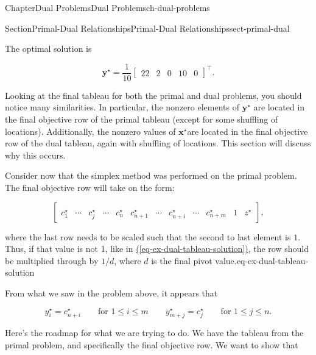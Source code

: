 \documentclass[oneside,10pt,]{book}
\newcommand{\xreffont}{\relax}
\numberwithin{equation}{section}
\newcommand{\amp}{&}
\begin{document}
\begin{chapterptx}{Chapter}{Dual Problems}{}{Dual Problems}{}{}{ch-dual-problems}
\begin{sectionptx}{Section}{Primal-Dual Relationships}{}{Primal-Dual Relationships}{}{}{sect-primal-dual}
\begin{equation}
\end{equation}
%
\par
The optimal solution is%
\par
%
\begin{equation*}
\boldsymbol{y}^{\star} = \frac{1}{10} \left[\begin{array}{rr|rrr} 22 \amp 2 \amp 0 \amp 10 \amp 0 \end{array} \right]^{\intercal}.
\end{equation*}
%
\par
Looking at the final tableau for both the primal and dual problems, you should notice many similarities. In particular, the nonzero elements of \(\boldsymbol{y}^{\star}\) are located in the final objective row of the primal tableau (except for some shuffling of locations). Additionally, the nonzero values of \(\boldsymbol{x}^{\star}\)are located in the final objective row of the dual tableau, again with shuffling of locations. This section will discuss why this occurs.%
\par
Consider now that the simplex method was performed on the primal problem. The final objective row will take on the form:%
\par
%
\begin{equation*}
\left[ \begin{array}{ccccc|cccccc|c} \amp\amp\amp\amp\amp\amp\amp\amp\amp\amp \\ \hline c_1^{\star} \amp \cdots \amp c_j^{\star} \amp \cdots \amp c_n^{\star} \amp c_{n+1}^{\star} \amp \cdots \amp c_{n+i}^{\star} \amp \cdots \amp c_{n+m}^{\star} \amp 1 \amp z^{\star} \end{array}  \right],
\end{equation*}
%
\par
where the last row needs to be scaled such that the second to last element is \(1\). Thus, if that value is not 1, like in \hyperref[eq-ex-dual-tableau-solution]{({\xreffont\ref{eq-ex-dual-tableau-solution}})}, the row should be multiplied through by \(1/d\), where \(d\) is the final pivot value.eq-ex-dual-tableau-solution%
\par
From what we saw in the problem above, it appears that%
\par
%
\begin{equation}
y_i^{\star}  = c_{n+i}^{\star} \qquad \text{for $1 \leq i \leq m$} \qquad y_{m+j}^{\star} = c_j^{\star} \qquad \text{for $1 \leq j \leq n$}.\label{eq-y-obj}
\end{equation}
%
\par
Here's the roadmap for what we are trying to do. We have the tableau from the primal problem, and specifically the final objective row. We want to show that%

\end{sectionptx}
\end{chapterptx}
\end{document}
